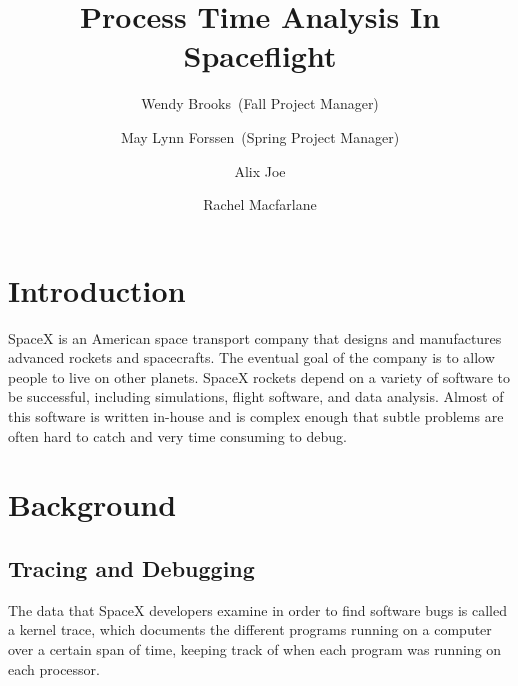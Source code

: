 \documentclass[midyear]{hmcclinic}
\title{Process Time Analysis In Spaceflight}
\author{Wendy Brooks~(Fall Project Manager) \and May Lynn Forssen~(Spring Project Manager) \and Alix Joe \and
Rachel Macfarlane}
\begin{document}

\maketitle




\section{Introduction} %
SpaceX is an American space transport company that designs and manufactures
advanced rockets and spacecrafts. The eventual goal of the company is to allow
people to live on other planets. SpaceX rockets depend on a variety of software
to be successful, including simulations, flight software, and data analysis.
Almost of this software is written in-house and is complex enough that subtle
problems are often hard to catch and very time consuming to debug.

\section{Background} %
\subsection{Tracing and Debugging}
The data that SpaceX developers examine in order to find software bugs is called a kernel trace, which documents the different programs running on a computer over a certain span of time, keeping track of when each program was running on each processor. 
\end{document}
